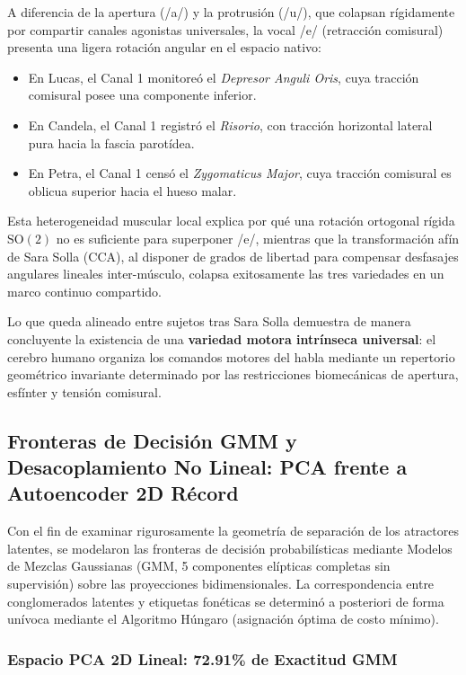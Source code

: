 \documentclass[11pt,a4paper]{article}
\begin{document}
A diferencia de la apertura (/a/) y la protrusión (/u/), que colapsan rígidamente por compartir canales agonistas universales, la vocal /e/ (retracción comisural) presenta una ligera rotación angular en el espacio nativo:
\begin{itemize}
    \item En Lucas, el Canal 1 monitoreó el \textit{Depresor Anguli Oris}, cuya tracción comisural posee una componente inferior.
    \item En Candela, el Canal 1 registró el \textit{Risorio}, con tracción horizontal lateral pura hacia la fascia parotídea.
    \item En Petra, el Canal 1 censó el \textit{Zygomaticus Major}, cuya tracción comisural es oblicua superior hacia el hueso malar.
\end{itemize}

Esta heterogeneidad muscular local explica por qué una rotación ortogonal rígida $\text{SO}(2)$ no es suficiente para superponer /e/, mientras que la transformación afín de Sara Solla (CCA), al disponer de grados de libertad para compensar desfasajes angulares lineales inter-músculo, colapsa exitosamente las tres variedades en un marco continuo compartido.

Lo que queda alineado entre sujetos tras Sara Solla demuestra de manera concluyente la existencia de una \textbf{variedad motora intrínseca universal}: el cerebro humano organiza los comandos motores del habla mediante un repertorio geométrico invariante determinado por las restricciones biomecánicas de apertura, esfínter y tensión comisural.

\subsection{Fronteras de Decisión GMM y Desacoplamiento No Lineal: PCA frente a Autoencoder 2D Récord}
\label{subsec:fronteras_gmm_pca_vs_ae_sara_solla}

Con el fin de examinar rigurosamente la geometría de separación de los atractores latentes, se modelaron las fronteras de decisión probabilísticas mediante Modelos de Mezclas Gaussianas (GMM, 5 componentes elípticas completas sin supervisión) sobre las proyecciones bidimensionales. La correspondencia entre conglomerados latentes y etiquetas fonéticas se determinó a posteriori de forma unívoca mediante el Algoritmo Húngaro (asignación óptima de costo mínimo).

\subsubsection{Espacio PCA 2D Lineal: 72.91\% de Exactitud GMM}
\label{subsubsec:espacio_pca_2d_fronteras}
\end{document}

